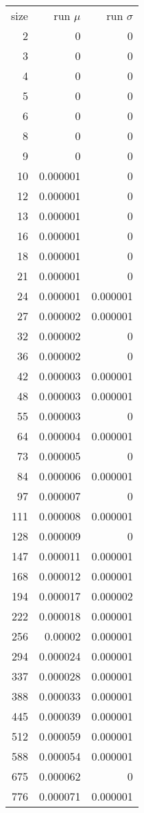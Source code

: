 \begin{longtable}{r r r}
size & run $\mu$ & run $\sigma$ \\
2 & 0 & 0 \\
3 & 0 & 0 \\
4 & 0 & 0 \\
5 & 0 & 0 \\
6 & 0 & 0 \\
8 & 0 & 0 \\
9 & 0 & 0 \\
10 & 0.000001 & 0 \\
12 & 0.000001 & 0 \\
13 & 0.000001 & 0 \\
16 & 0.000001 & 0 \\
18 & 0.000001 & 0 \\
21 & 0.000001 & 0 \\
24 & 0.000001 & 0.000001 \\
27 & 0.000002 & 0.000001 \\
32 & 0.000002 & 0 \\
36 & 0.000002 & 0 \\
42 & 0.000003 & 0.000001 \\
48 & 0.000003 & 0.000001 \\
55 & 0.000003 & 0 \\
64 & 0.000004 & 0.000001 \\
73 & 0.000005 & 0 \\
84 & 0.000006 & 0.000001 \\
97 & 0.000007 & 0 \\
111 & 0.000008 & 0.000001 \\
128 & 0.000009 & 0 \\
147 & 0.000011 & 0.000001 \\
168 & 0.000012 & 0.000001 \\
194 & 0.000017 & 0.000002 \\
222 & 0.000018 & 0.000001 \\
256 & 0.00002 & 0.000001 \\
294 & 0.000024 & 0.000001 \\
337 & 0.000028 & 0.000001 \\
388 & 0.000033 & 0.000001 \\
445 & 0.000039 & 0.000001 \\
512 & 0.000059 & 0.000001 \\
588 & 0.000054 & 0.000001 \\
675 & 0.000062 & 0 \\
776 & 0.000071 & 0.000001 \\

\end{longtable}
